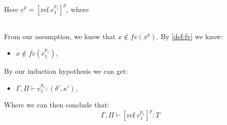 \item[\runa{T-Ref}] Here $e^p=[\mbox{ref}\;e_1^{p_1}]^p$, where
\begin{figure}[H]
	\setlength\tabcolsep{8pt}
	\begin{tabular}{l}
		
	\end{tabular}
\end{figure}
From our assumption, we know that $x\notin fv(x^p)$.
By \cref{def:fv} we know:
\begin{itemize}
	\item $x\notin fv(e_1^{p_1})$,
\end{itemize}
By our induction hypothesis we can get:
\begin{itemize}
	\item $\Gamma,\Pi\vdash e_1^{p_1}:(\delta',\kappa')$,
\end{itemize}
Where we can then conclude that:
$$\Gamma,\Pi\vdash [\mbox{ref}\;e_1^{p_1}]^{p}:T$$
